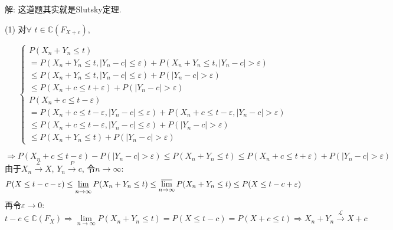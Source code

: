 \documentclass[standard]{ExBook}
\begin{document}
\begin{qitems}
\vspace{-5em}

    \begin{bbox}
解: 这道题其实就是Slutsky定理.

(1) 对$\forall$ $t\in\mathbb{C}\left(F_{X+c}\right)$,
\vspace{-2em}
\begin{center}
\begin{equation}
    \left\{
    \begin{array}{l}
        \nonumber
        P(X_n+Y_n\leq t)\\
        = P(X_n+Y_n\leq t,|Y_n-c|\leq \varepsilon)+P(X_n+Y_n\leq t,|Y_n-c|>\varepsilon)\\
        \leq P(X_n+Y_n\leq t,|Y_n-c|\leq \varepsilon)+P(|Y_n-c|>\varepsilon)\\
        \leq P(X_n+c\leq t+\varepsilon)+P(|Y_n-c|>\varepsilon)\\
        P(X_n+c\leq t-\varepsilon)\\
        = P(X_n+c\leq t-\varepsilon,|Y_n-c|\leq \varepsilon)+P(X_n+c\leq t-\varepsilon,|Y_n-c|> \varepsilon)\\
        \leq P(X_n+c\leq t-\varepsilon,|Y_n-c|\leq \varepsilon)+P(|Y_n-c|> \varepsilon)\\
        \leq P(X_n+Y_n\leq t)+P(|Y_n-c|>\varepsilon)
    \end{array}
    \right.
\end{equation}
\end{center}
$$\Longrightarrow P(X_n+c\leq t-\varepsilon)-P(|Y_n-c|>\varepsilon) \leq P(X_n+Y_n\leq t) \leq P(X_n+c\leq t+\varepsilon)+P(|Y_n-c|>\varepsilon)$$
由于$X_n\xrightarrow{\mathcal{L}}X$, $Y_n\xrightarrow{P}c$, 令$n\to\infty$:
$$P(X\leq t-c-\varepsilon) \leq \varliminf\limits_{n\to\infty}P(X_n+Y_n\leq t) \leq \varlimsup\limits_{n\to\infty}P(X_n+Y_n\leq t) \leq P(X\leq t-c+\varepsilon)$$
再令$\varepsilon\to0$:
$$t-c\in\mathbb{C}\left(F_{X}\right) \Longrightarrow \lim\limits_{n\to\infty}P(X_n+Y_n\leq t)=P(X\leq t-c)=P(X+c\leq t) \Longrightarrow X_n+Y_n\xrightarrow{\mathcal{L}}X+c$$
    \end{bbox}

\vspace{-5em}


\end{qitems}
\end{document}
